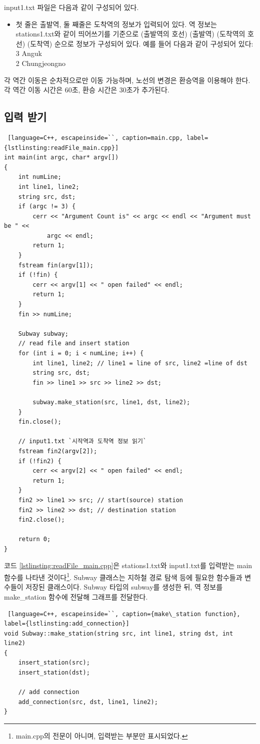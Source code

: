 \documentclass{article}
\begin{document}
input1.txt 파일은 다음과 같이 구성되어 있다.
\begin{itemize}
    \item 첫 줄은 출발역, 둘 째줄은 도착역의 정보가 입력되어 있다. 역 정보는 stations1.txt와 같이 띄어쓰기를 기준으로 (출발역의 호선) (출발역) (도착역의 호선) (도착역) 순으로 정보가 구성되어 있다. 예를 들어 다음과 같이 구성되어 있다:\\
    3 Anguk\\
    2 Chungjeongno
\end{itemize}

각 역간 이동은 순차적으로만 이동 가능하며, 노선의 변경은 환승역을 이용해야 한다. 각 역간 이동 시간은 60초, 환승 시간은 30초가 추가된다.

\subsection{입력 받기}
\begin{lstlisting} [language=C++, escapeinside=``, caption=main.cpp, label={lstlinsting:readFile_main.cpp}]
int main(int argc, char* argv[])
{
	int numLine;
	int line1, line2;
	string src, dst;
	if (argc != 3) {
		cerr << "Argument Count is" << argc << endl << "Argument must be " <<
			argc << endl;
		return 1;
	}
	fstream fin(argv[1]);
	if (!fin) {
		cerr << argv[1] << " open failed" << endl;
		return 1;
	}
	fin >> numLine;
	
	Subway subway;
	// read file and insert station
	for (int i = 0; i < numLine; i++) {
		int line1, line2; // line1 = line of src, line2 =line of dst
		string src, dst;
		fin >> line1 >> src >> line2 >> dst;

		subway.make_station(src, line1, dst, line2);
	}
	fin.close();

	// input1.txt `시작역과 도착역 정보 읽기`
	fstream fin2(argv[2]);
	if (!fin2) {
		cerr << argv[2] << " open failed" << endl;
		return 1;
	}
	fin2 >> line1 >> src; // start(source) station
	fin2 >> line2 >> dst; // destination station
	fin2.close();
 
	return 0;
}
\end{lstlisting}

코드 \ref{lstlinsting:readFile_main.cpp}은 stations1.txt와 input1.txt를 입력받는 main함수를 나타낸 것이다\footnote{main.cpp의 전문이 아니며, 입력받는 부분만 표시되었다.}. Subway 클래스는 지하철 경로 탐색 등에 필요한 함수들과 변수들이 저장된 클래스이다. Subway 타입의 subway를 생성한 뒤, 역 정보를 make\_station 함수에 전달해 그래프를 전달한다.

\begin{lstlisting} [language=C++, escapeinside=``, caption={make\_station function}, label={lstlinsting:add_connection}]
void Subway::make_station(string src, int line1, string dst, int line2)
{
	insert_station(src);
	insert_station(dst);

	// add connection
	add_connection(src, dst, line1, line2);
}
\end{lstlisting}
\end{document}
